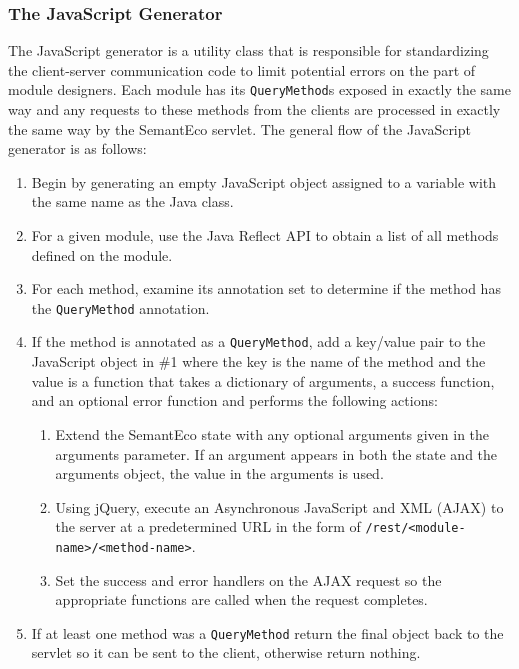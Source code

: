 \documentclass[letterpaper]{report}
\begin{document}
\subsubsection{The JavaScript Generator}
The JavaScript generator is a utility class that is responsible for standardizing the client-server communication code to limit potential errors on the part of module designers. Each module has its \texttt{QueryMethod}s exposed in exactly the same way and any requests to these methods from the clients are processed in exactly the same way by the SemantEco servlet. The general flow of the JavaScript generator is as follows:

\begin{enumerate}
\item Begin by generating an empty JavaScript object assigned to a variable with the same name as the Java class.
\item For a given module, use the Java Reflect API to obtain a list of all methods defined on the module.
\item For each method, examine its annotation set to determine if the method has the \texttt{QueryMethod} annotation.
\item If the method is annotated as a \texttt{QueryMethod}, add a key/value pair to the JavaScript object in \#1 where the key is the name of the method and the value is a function that takes a dictionary of arguments, a success function, and an optional error function and performs the following actions:
\begin{enumerate}
\item Extend the SemantEco state with any optional arguments given in the arguments parameter. If an argument appears in both the state and the arguments object, the value in the arguments is used.
\item Using jQuery, execute an Asynchronous JavaScript and XML (AJAX) to the server at a predetermined URL in the form of \texttt{/rest/<module-name>/<method-name>}.
\item Set the success and error handlers on the AJAX request so the appropriate functions are called when the request completes.
\end{enumerate}
\item If at least one method was a \texttt{QueryMethod} return the final object back to the servlet so it can be sent to the client, otherwise return nothing.
\end{enumerate}
\end{document}
